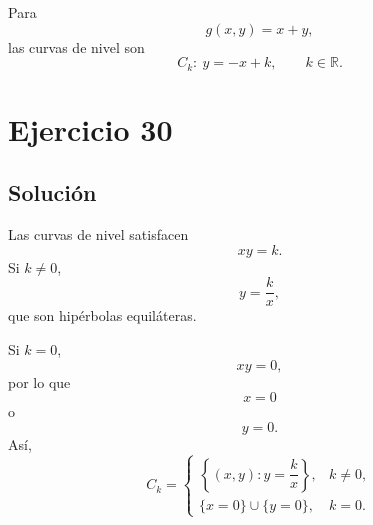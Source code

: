 \documentclass[11pt,a4paper]{article}
\newcommand{\R}{\mathbb{R}}
\begin{document}
Para
\[
g(x,y)=x+y,
\]
las curvas de nivel son
\[
\boxed{
C_k:\ y=-x+k,
\qquad k\in\R.
}
\]

\section{Ejercicio 30}
\subsection{Solución}
Las curvas de nivel satisfacen
\[
xy=k.
\]
Si \(k\neq0\),
\[
y=\frac{k}{x},
\]
que son hipérbolas equiláteras.

Si \(k=0\),
\[
xy=0,
\]
por lo que
\[
x=0
\]
o
\[
y=0.
\]
Así,
\[
\boxed{
C_k=
\begin{cases}
\left\{(x,y):y=\dfrac{k}{x}\right\},&k\neq0,\\[2mm]
\{x=0\}\cup\{y=0\},&k=0.
\end{cases}
}
\]
\end{document}
